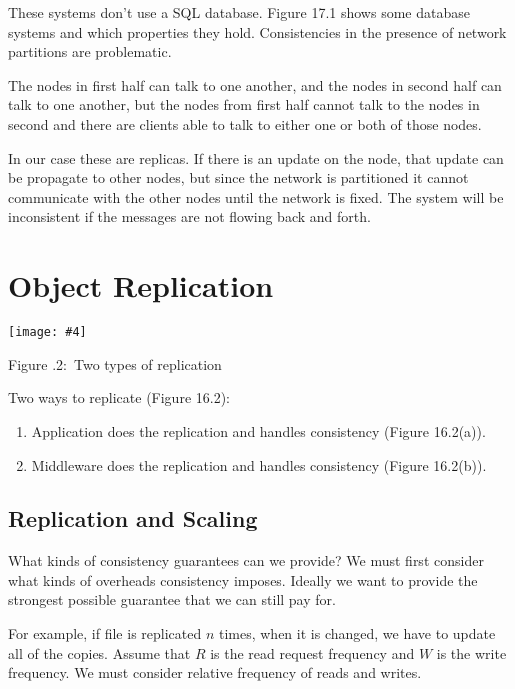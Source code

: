 \documentclass[twoside]{article}
\newcounter{lecnum}
\newcommand{\fig}[4]{
            \centerline{\texttt{[image: \#4]}}
            \begin{center}
            Figure \thelecnum.#1:~#3
            \end{center}
    }
\begin{document}
These systems don't use a SQL database. Figure 17.1 shows some database systems and which properties they hold. Consistencies in the presence of network partitions are problematic.

The nodes in first half can talk to one another, and the nodes in second half can talk to one another, but the nodes from first half cannot talk to the nodes in second and there are clients able to talk to either one or both of those nodes.

In our case these are replicas. If there is an update on the node, that update can be propagate to other nodes, but since the network is partitioned it cannot communicate with the other nodes until the network is fixed. The system will be inconsistent if the messages are not flowing back and forth.

\section{Object Replication}

\fig{2}{0.3}{Two types of replication}{replication}

Two ways to replicate (Figure 16.2):

\begin{enumerate}

    \item Application does the replication and handles consistency (Figure 16.2(a)). 
    \item Middleware does the replication and handles consistency (Figure 16.2(b)).
    
\end{enumerate}

\subsection{Replication and Scaling}

What kinds of consistency guarantees can we provide? We must first consider what kinds of overheads consistency imposes. Ideally we want to provide the strongest possible guarantee that we can still pay for.

For example, if file is replicated $n$ times, when it is changed, we have to update all of the copies. Assume that $R$ is the read request frequency and $W$ is the write frequency. We must consider relative frequency of reads and writes.
\end{document}
